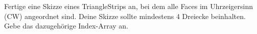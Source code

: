 \documentclass[../../main.tex]{subfiles}
\begin{document}
Fertige eine Skizze eines TriangleStrips an, bei dem alle Faces im Uhrzeigersinn (CW) angeordnet sind. Deine Skizze sollte mindestens 4 Dreiecke beinhalten. Gebe das dazugehörige Index-Array an.
\end{document}
